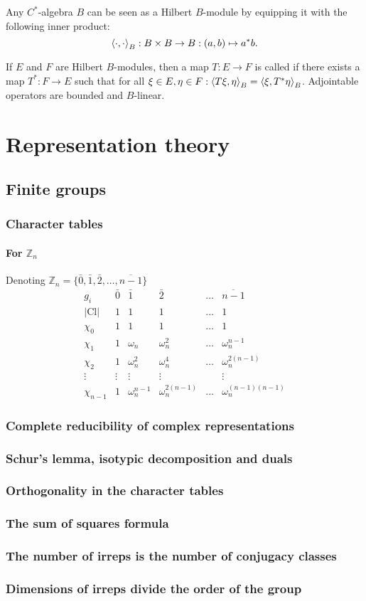 Any $C^*$-algebra $B$ can be seen as a Hilbert $B$-module by equipping it with the following inner product:
\[ \inner{\cdot, \cdot}_B: B\times B\to B: (a,b) \mapsto a^*b. \]

If $E$ and $F$ are Hilbert $B$-modules, then a map $T: E \to F$ is called  if there exists a map $T^*: F \to E$ such that for all $\xi\in E, \eta\in F: \inner{T\xi,\eta}_B = \inner{\xi, T^*\eta}_B$. Adjointable operators are bounded and $B$-linear.





\chapter{Representation theory}
\section{Finite groups}
\subsection{Character tables}
\subsubsection{For $\mathbb{Z}_n$}
Denoting $\mathbb{Z}_n = \{\bar{0}, \bar{1}, \bar{2},\ldots, \overline{n-1}\}$
\[ \begin{array}{l|lllll}
g_i & \bar{0} & \bar{1} & \bar{2} & \hdots & \overline{n-1} \\
|\text{Cl}| & 1 & 1 & 1 & \hdots & 1 \\ \hline
\chi_0 & 1 & 1 & 1 & \hdots & 1 \\
\chi_1 & 1 & \omega_n & \omega^2_n & \hdots & \omega_n^{n-1} \\
\chi_2 & 1 & \omega_n^2 & \omega^4_n & \hdots & \omega_n^{2(n-1)} \\
\vdots & \vdots & \vdots & \vdots &  & \vdots \\
\chi_{n-1} & 1 & \omega_n^{n-1} & \omega_n^{2(n-1)} & \hdots & \omega_n^{(n-1)(n-1)}
\end{array} \]

\subsection{Complete reducibility of complex representations}

\subsection{Schur's lemma, isotypic decomposition and duals}
\subsection{Orthogonality in the character tables}
\subsection{The sum of squares formula}
\subsection{The number of irreps is the number of conjugacy classes}
\subsection{Dimensions of irreps divide the order of the group}